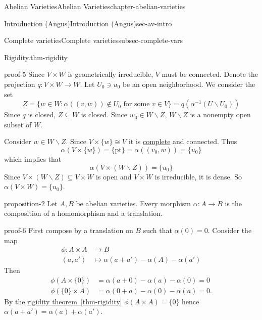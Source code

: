 \documentclass[oneside,10pt,]{book}
\numberwithin{equation}{section}
\newcommand{\amp}{&}
\begin{document}
\begin{chapterptx}{Abelian Varieties}{}{Abelian Varieties}{}{}{chapter-abelian-varieties}
\begin{sectionptx}{Introduction (Angus)}{}{Introduction (Angus)}{}{}{sec-av-intro}
\begin{subsectionptx}{Complete varieties}{}{Complete varieties}{}{}{subsec-complete-vars}
\begin{theorem}{Rigidity.}{}{thm-rigidity}
\end{theorem}
\begin{proofptx}{}{proof-5}
\hypertarget{p-31}{}%
Since \(V\times W\) is geometrically irreducible, \(V\) must be connected. Denote the projection \(q\colon V\times W \to W\). Let \(U_0 \ni u_0\) be an open neighborhood. We consider the set%
\begin{equation*}
Z = \{w\in W : \alpha((v,w)) \not\in U_0 \text{ for some } v\in V\} = q(\alpha^{-1}(U\smallsetminus U_0))
\end{equation*}
Since \(q\) is closed, \(Z\subseteq W\) is closed. Since \(w_0\in W\smallsetminus Z\), \(W\smallsetminus Z\) is a nonempty open subset of \(W\).%
\par
\hypertarget{p-32}{}%
Consider \(w \in W\smallsetminus Z\). Since \(V\times\{w\} \cong V\) it is \hyperref[def-abelian-complete-var]{complete} and connected. Thus%
\begin{equation*}
\alpha(V\times \{w\}) = \{\text{pt}\} = \alpha((v_0,w)) = \{u_0\}
\end{equation*}
which implies that%
\begin{equation*}
\alpha(V\times (W\smallsetminus Z)) = \{u_0\}
\end{equation*}
Since \(V\times (W\smallsetminus Z) \subseteq V\times W\) is open and \(V\times W\) is irreducible, it is dense. So \(\alpha(V\times W) = \{u_0\}\).%
\end{proofptx}
\begin{proposition}{}{}{proposition-2}%
\hypertarget{p-33}{}%
Let \(A,B\) be \hyperref[def-buntes-abvar]{abelian varieties}. Every morphism \(\alpha \colon A \to B \) is the composition of a homomorphism and a translation.%
\end{proposition}
\begin{proofptx}{}{proof-6}
\hypertarget{p-34}{}%
First compose by a translation on \(B\) such that \(\alpha(0) = 0\). Consider the map%
\begin{align*}
\phi \colon A\times A\amp\to B\\
(a,a')               \amp\mapsto \alpha(a+a') - \alpha(A) -\alpha(a')
\end{align*}
Then%
\begin{align*}
\phi(A\times\{0\}) \amp = \alpha(a+ 0) - \alpha(a) - \alpha(0) = 0\\
\phi(\{0\}\times A) \amp = \alpha(0+ a) - \alpha(0) - \alpha(a) = 0\text{.}
\end{align*}
By the \hyperref[thm-rigidity]{rigidity theorem~\ref{thm-rigidity}} \(\phi(A\times A) = \{0\}\) hence \(\alpha(a + a') = \alpha(a) + \alpha(a')\).%

\end{proofptx}
\end{subsectionptx}
\end{sectionptx}
\end{chapterptx}
\end{document}

